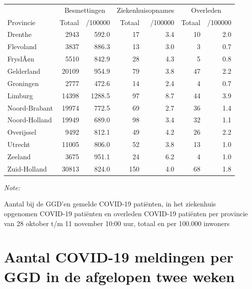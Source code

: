 \documentclass[
  english,
  man,floatsintext]{apa6}
\begin{document}
\begin{table}
\centering
\begin{threeparttable}
\begin{tabular}{lrrrrrr}
\toprule
\multicolumn{1}{c}{ } & \multicolumn{2}{c}{Besmettingen} & \multicolumn{2}{c}{Ziekenhuisopnames} & \multicolumn{2}{c}{Overleden} \\
\cmidrule(l{3pt}r{3pt}){2-3} \cmidrule(l{3pt}r{3pt}){4-5} \cmidrule(l{3pt}r{3pt}){6-7}
Provincie & Totaal & /100000 & Totaal & /100000 & Totaal & /100000\\
\midrule
Drenthe & 2943 & 592.0 & 17 & 3.4 & 10 & 2.0\\
Flevoland & 3837 & 886.3 & 13 & 3.0 & 3 & 0.7\\
FryslÃ¢n & 5510 & 842.9 & 28 & 4.3 & 5 & 0.8\\
Gelderland & 20109 & 954.9 & 79 & 3.8 & 47 & 2.2\\
Groningen & 2777 & 472.6 & 14 & 2.4 & 4 & 0.7\\
Limburg & 14398 & 1288.5 & 97 & 8.7 & 44 & 3.9\\
Noord-Brabant & 19974 & 772.5 & 69 & 2.7 & 36 & 1.4\\
Noord-Holland & 19949 & 689.0 & 98 & 3.4 & 32 & 1.1\\
Overijssel & 9492 & 812.1 & 49 & 4.2 & 26 & 2.2\\
Utrecht & 11005 & 806.0 & 52 & 3.8 & 13 & 1.0\\
Zeeland & 3675 & 951.1 & 24 & 6.2 & 4 & 1.0\\
Zuid-Holland & 30813 & 824.0 & 150 & 4.0 & 68 & 1.8\\
\bottomrule
\end{tabular}
\begin{tablenotes}
\item \textit{Note: } 
\item Aantal bij de GGD’en gemelde COVID-19 patiënten, in het ziekenhuis opgenomen COVID-19 patiënten en overleden COVID-19 patiënten per provincie van 28 oktober t/m 11 november 10:00 uur, totaal en per 100.000 inwoners
\end{tablenotes}
\end{threeparttable}
\end{table}

\newpage

\hypertarget{aantal-covid-19-meldingen-per-ggd-in-de-afgelopen-twee-weken}{%
\section{Aantal COVID-19 meldingen per GGD in de afgelopen twee weken}\label{aantal-covid-19-meldingen-per-ggd-in-de-afgelopen-twee-weken}}
\end{document}

